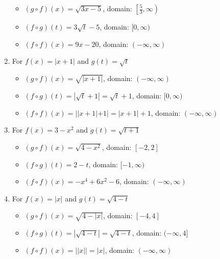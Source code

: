 \begin{enumerate}
\begin{itemize}
\item  $(g \circ f)(x) = \sqrt{3x-5}$, domain: $\left[ \frac{5}{3}, \infty \right)$

\item  $(f \circ g)(t) = 3\sqrt{t}-5$, domain: $[0,\infty)$

\item  $(f \circ f)(x) = 9x-20$, domain: $(-\infty, \infty)$

\end{itemize}


\item For   $f(x) = |x+1|$ and $g(t) = \sqrt{t}$

\begin{itemize}

\item  $(g \circ f)(x) = \sqrt{|x+1|}$, domain: $(-\infty, \infty)$

\item  $(f \circ g)(t) = |\sqrt{t}+1| = \sqrt{t}+1$, domain: $[0,\infty)$

\item  $(f \circ f)(x) = ||x+1|+1| = |x+1|+1$, domain: $(-\infty, \infty)$

\end{itemize}


\item For   $f(x) = 3-x^2$ and $g(t) = \sqrt{t+1}$ 

\begin{itemize}

\item  $(g \circ f)(x) = \sqrt{4-x^2}$, domain: $[-2,2]$

\item  $(f \circ g)(t) =2-t$, domain: $[-1, \infty)$

\item  $(f \circ f)(x) = -x^4+6x^2-6$, domain: $(-\infty, \infty)$

\end{itemize}

\item For   $f(x) = |x|$ and $g(t) = \sqrt{4-t}$

\begin{itemize}

\item  $(g \circ f)(x) = \sqrt{4-|x|}$, domain: $[-4,4]$

\item  $(f \circ g)(t) =|\sqrt{4-t}| = \sqrt{4-t}$, domain: $(-\infty, 4]$

\item  $(f \circ f)(x) = | |x| | = |x|$, domain: $(-\infty, \infty)$


\end{itemize}
\end{enumerate}

